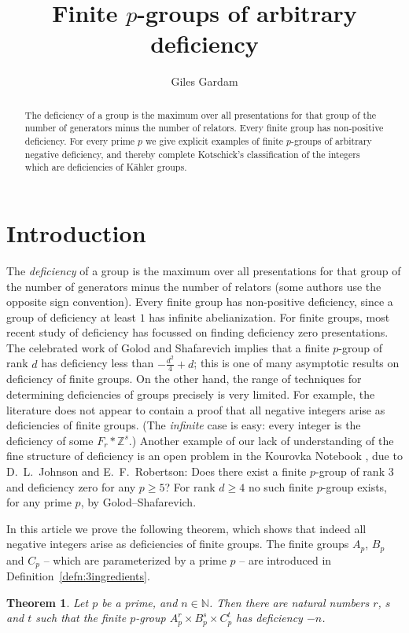 \documentclass[a4paper,12pt]{amsart}
\author{Giles Gardam}
\title{Finite $p$-groups of arbitrary deficiency}
\theoremstyle{plain}
\newtheorem{thm}{Theorem}
\theoremstyle{definition}
\newcommand{\N}{\mathbb{N}}
\newcommand{\Z}{\mathbb{Z}}
\begin{document}

\begin{abstract}
    The deficiency of a group is the maximum over all presentations for that group of the number of generators minus the number of relators.
    Every finite group has non-positive deficiency.
    For every prime $p$ we give explicit examples of finite $p$-groups of arbitrary negative deficiency, and thereby complete Kotschick's classification \cite{kotschick} of the integers which are deficiencies of Kähler groups.
\end{abstract}

\maketitle

\section{Introduction}
The \emph{deficiency} of a group is the maximum over all presentations for that group of the number of generators minus the number of relators (some authors use the opposite sign convention).
Every finite group has non-positive deficiency, since a group of deficiency at least $1$ has infinite abelianization.
For finite groups, most recent study of deficiency has focussed on finding deficiency zero presentations.
The celebrated work of Golod and Shafarevich implies that a finite $p$-group of rank $d$ has deficiency less than $-\frac{d^2}{4}+d$; this is one of many asymptotic results on deficiency of finite groups.
On the other hand, the range of techniques for determining deficiencies of groups precisely is very limited.
For example, the literature does not appear to contain a proof that all negative integers arise as deficiencies of finite groups.
(The \emph{infinite} case is easy: every integer is the deficiency of some $F_r * \Z^s$.)
Another example of our lack of understanding of the fine structure of deficiency is an open problem in the Kourovka Notebook \cite[8.12(a)]{kourovka}, due to D.~L.~Johnson and E.~F.~Robertson:  Does there exist a finite $p$-group of rank $3$ and deficiency zero for any $p \geq 5$?
For rank $d \geq 4$ no such finite $p$-group exists, for any prime $p$, by Golod--Shafarevich.

In this article we prove the following theorem, which shows that indeed all negative integers arise as deficiencies of finite groups.
The finite groups $A_p$, $B_p$ and $C_p$ -- which are parameterized by a prime $p$ -- are introduced in Definition~\ref{defn:3ingredients}.
\begin{thm}
    \label{thm:main}
    Let $p$ be a prime, and $n \in \N$.
    Then there are natural numbers $r$, $s$ and $t$ such that the finite $p$-group $A_p^r \times B_p^s \times C_p^t$ has deficiency $-n$.
\end{thm}
\end{document}
